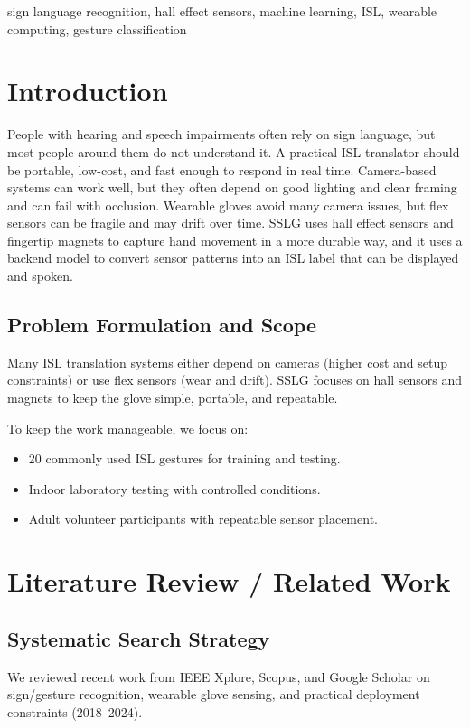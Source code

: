 \documentclass[conference]{IEEEtran}
\begin{document}
\begin{IEEEkeywords}
sign language recognition, hall effect sensors, machine learning, ISL, wearable computing, gesture classification
\end{IEEEkeywords}

\section{Introduction}
People with hearing and speech impairments often rely on sign language, but most people around them do not understand it. A practical ISL translator should be portable, low-cost, and fast enough to respond in real time. Camera-based systems can work well, but they often depend on good lighting and clear framing and can fail with occlusion\cite{mitra}. Wearable gloves avoid many camera issues, but flex sensors can be fragile and may drift over time. SSLG uses hall effect sensors and fingertip magnets to capture hand movement in a more durable way, and it uses a backend model to convert sensor patterns into an ISL label that can be displayed and spoken.

\subsection{Problem Formulation and Scope}
Many ISL translation systems either depend on cameras (higher cost and setup constraints) or use flex sensors (wear and drift). SSLG focuses on hall sensors and magnets to keep the glove simple, portable, and repeatable.

To keep the work manageable, we focus on:
\begin{itemize}[noitemsep]
    \item 20 commonly used ISL gestures for training and testing.
    \item Indoor laboratory testing with controlled conditions.
    \item Adult volunteer participants with repeatable sensor placement.
\end{itemize}

\section{Literature Review / Related Work}
\subsection{Systematic Search Strategy}
We reviewed recent work from IEEE Xplore, Scopus, and Google Scholar on sign/gesture recognition, wearable glove sensing, and practical deployment constraints (2018--2024).
\end{document}
